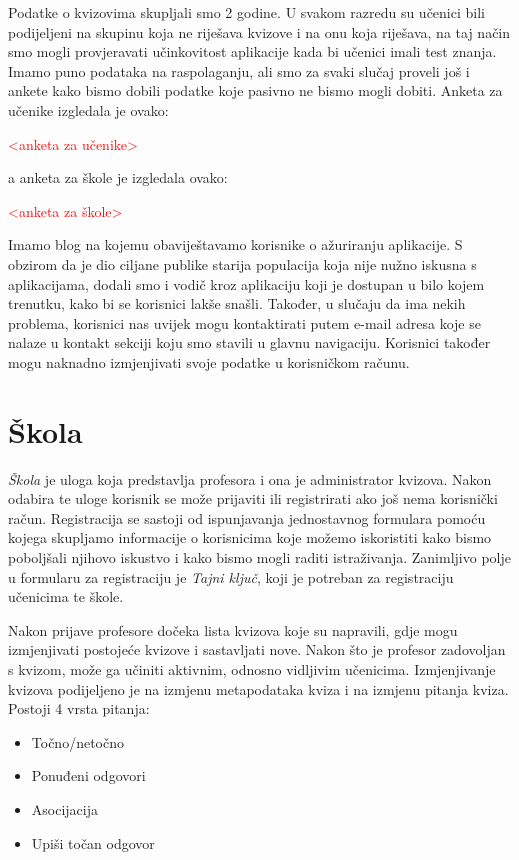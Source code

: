 \documentclass{scrreprt}
\begin{document}
Podatke o kvizovima skupljali smo 2 godine. U svakom razredu su učenici bili
podijeljeni na skupinu koja ne riješava kvizove i na onu koja riješava, na taj
način smo mogli provjeravati učinkovitost aplikacije kada bi učenici imali test
znanja. Imamo puno podataka na raspolaganju, ali smo za svaki slučaj proveli još
i ankete kako bismo dobili podatke koje pasivno ne bismo mogli dobiti. Anketa za
učenike izgledala je ovako:

\textcolor{red}{<anketa za učenike>}

a anketa za škole je izgledala ovako:

\textcolor{red}{<anketa za škole>}

Imamo blog na kojemu obaviještavamo korisnike o ažuriranju aplikacije. S obzirom
da je dio ciljane publike starija populacija koja nije nužno iskusna s
aplikacijama, dodali smo i vodič kroz aplikaciju koji je dostupan u bilo kojem
trenutku, kako bi se korisnici lakše snašli. Također, u slučaju da ima nekih
problema, korisnici nas uvijek mogu kontaktirati putem e-mail adresa koje se
nalaze u kontakt sekciji koju smo stavili u glavnu navigaciju. Korisnici također
mogu naknadno izmjenjivati svoje podatke u korisničkom računu.

\section{Škola}

\emph{Škola} je uloga koja predstavlja profesora i ona je administrator kvizova.
Nakon odabira te uloge korisnik se može prijaviti ili registrirati ako još nema
korisnički račun. Registracija se sastoji od ispunjavanja jednostavnog formulara
pomoću kojega skupljamo informacije o korisnicima koje možemo iskoristiti kako
bismo poboljšali njihovo iskustvo i kako bismo mogli raditi istraživanja.
Zanimljivo polje u formularu za registraciju je \emph{Tajni ključ}, koji je
potreban za registraciju učenicima te škole.

Nakon prijave profesore dočeka lista kvizova koje su napravili, gdje mogu
izmjenjivati postojeće kvizove i sastavljati nove. Nakon što je profesor
zadovoljan s kvizom, može ga učiniti aktivnim, odnosno vidljivim učenicima.
Izmjenjivanje kvizova podijeljeno je na izmjenu metapodataka kviza i na izmjenu
pitanja kviza. Postoji 4 vrsta pitanja:

\begin{itemize}
  \item Točno/netočno
  \item Ponuđeni odgovori
  \item Asocijacija
  \item Upiši točan odgovor
\end{itemize}
\end{document}
